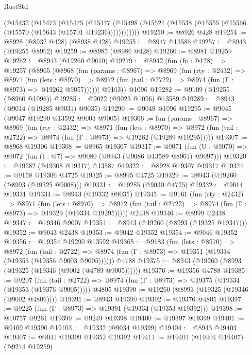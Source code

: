 \begin{lexlean}{RustStd}
\begin{coremodule}
{\begin{coremodule}
{{{{{{{{{{{{{{{{{{{{{{{{{{{{{{{{{{{{{{{    (@15432
      (@15473
        (@15475
          (@15477 (@15498 (@15521 (@15538 (@15555 (@15566 (@15570 (@15643 (@15701 @19236))))))))))))
@19250 := @8926 @428
@19254 := @8928 (@8932 @428) (@8938 @428)
@19255 := @8947 @13586
@19257 := @8943 (@19255 @8962)
@19259 := @8985 (@8986 @428)
@19260 := @8981 @19259
@19262 := @8943 (@19260 @9010)
@19279 := @8942
    (fun (fn : @128) =>
    @19257
      (@8965
        (@8968
          (fun (params : @8967) =>
          @8969
            (fun (rty : @2432) =>
            @8971
              (fun (lets : @8970) =>
              @8972 (fun (tail : @2722) => @8974 (fun (Γ : @8973) => @19262 @9057))))))
        @9103))
    @1096
@19282 := @9109 (@19255 (@8960 @1096))
@19285 := @9022 (@9023 @1096) @13589
@19289 := @8943 (@9014 (@19285 @9031) @9035)
@19290 := @9048 @1096
@19295 := @9045 (@9047 @19290 @13592 @9003 @9005)
@19306 := fun (params : @8967) =>
  @8969
    (fun (rty : @2432) =>
    @8971
      (fun (lets : @8970) =>
      @8972 (fun (tail : @2722) => @8974 (fun (Γ : @8973) => @19262 (@19289 @19295)))))
@19307 := @8968 @19306
@19308 := @8965 @19307
@19317 := @9071
    (fun (U : @9070) => @9072 (fun (t : @7) => @9080 (@8943 (@9086 @13589 @8961) @9097)))
@19320 := @19282 (@19308 @19317) @13587
@19322 := @8928 @19307 @19317
@19324 := @9158 @19306 @4725
@19325 := @8995 @4725
@19329 := @8943 (@19260 (@8993 (@19325 @9008)))
@19331 := @19285 (@9030 @4725)
@19332 := @9014 @19331
@19334 := @8943 (@19332 @9035)
@19345 := @9161
    (fun (rty : @2432) =>
    @8971
      (fun (lets : @8970) =>
      @8972 (fun (tail : @2722) => @8974 (fun (Γ : @8973) => @19329 (@19334 @19295)))))
    @2438
@19346 := @8999 @2438
@19347 := @19346 @9007
@19351 := @8943 (@19260 (@8993 (@19325 @19347)))
@19352 := @9043 @2438
@19353 := @9042 @19352
@19354 := @9046 @19352
@19356 := @19354 @19290 @13592
@19368 := @9183
    (fun (lets : @8970) =>
    @8972
      (fun (tail : @2722) =>
      @8974 (fun (Γ : @8973) => @19351 (@19334 (@19353 (@19356 @9003 @9005))))))
    @4788
@19375 := @8943 (@19260 (@8993 (@19325 (@19346 (@9002 (@4789 @9005))))))
@19376 := @19356 @4788
@19385 := @9207
    (fun (tail : @2722) => @8974 (fun (Γ : @8973) => @19375 (@19334 (@19353 (@19376 @9005)))))
    @4805
@19390 := @19260 (@8993 (@19325 (@19346 (@9002 @4806))))
@19391 := @8943 @19390
@19392 := @19376 @4805
@19397 := @9225 (fun (Γ : @8973) => @19391 (@19334 (@19353 @19392)))
@19398 := @10757 @9261
@19399 := @9249 @19398
@19400 := @19397 @19399
@19401 := @9109 @19390
@19403 := @19332 (@9034 @19399)
@19404 := @8943 @19403
@19407 := @9041 @19399 @19352 @19392
@19411 := @19401 (@19404 @19407) (@9274 @19259)
}}}}}}}}}}}}}}}}}}}}}}}}}}}}}}}}}}}}}}}
\end{coremodule}}
\end{coremodule}
\end{lexlean}
